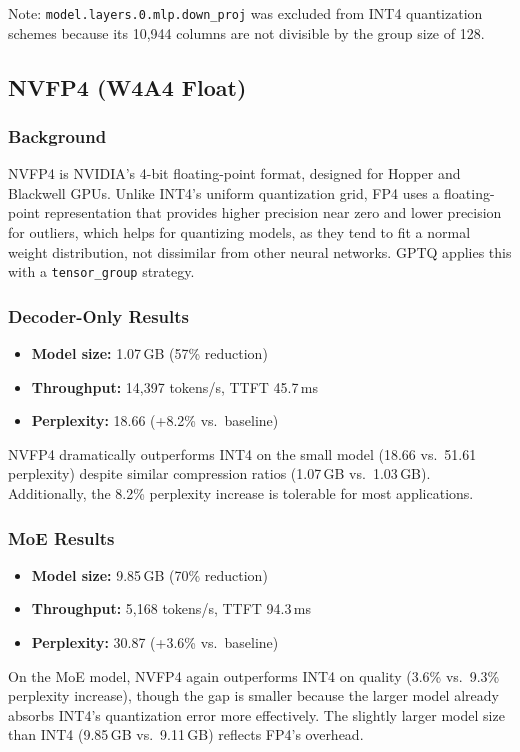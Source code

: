 \documentclass[10pt,twocolumn]{article}
\begin{document}
Note: \texttt{model.layers.0.mlp.down\_proj} was excluded from INT4 quantization schemes because its 10{,}944 columns are not divisible by the group size of 128.

\subsection{NVFP4 (W4A4 Float)}
\subsubsection{Background}
NVFP4 is NVIDIA's 4-bit floating-point format, designed for Hopper and Blackwell GPUs. Unlike INT4's uniform quantization grid, FP4 uses a floating-point representation that provides higher precision near zero and lower precision for outliers, which helps for quantizing models, as they tend to fit a normal weight distribution, not dissimilar from other neural networks. GPTQ applies this with a \texttt{tensor\_group} strategy.

\subsubsection{Decoder-Only Results}
\begin{itemize}
  \item \textbf{Model size:} 1.07\,GB (57\% reduction)
  \item \textbf{Throughput:} 14{,}397 tokens/s, TTFT 45.7\,ms
  \item \textbf{Perplexity:} 18.66 (+8.2\% vs.\ baseline)
\end{itemize}
NVFP4 dramatically outperforms INT4 on the small model (18.66 vs.\ 51.61 perplexity) despite similar compression ratios (1.07\,GB vs.\ 1.03\,GB). Additionally, the 8.2\% perplexity increase is tolerable for most applications.

\subsubsection{MoE Results}
\begin{itemize}
  \item \textbf{Model size:} 9.85\,GB (70\% reduction)
  \item \textbf{Throughput:} 5{,}168 tokens/s, TTFT 94.3\,ms
  \item \textbf{Perplexity:} 30.87 (+3.6\% vs.\ baseline)
\end{itemize}
On the MoE model, NVFP4 again outperforms INT4 on quality (3.6\% vs.\ 9.3\% perplexity increase), though the gap is smaller because the larger model already absorbs INT4's quantization error more effectively. The slightly larger model size than INT4 (9.85\,GB vs.\ 9.11\,GB) reflects FP4's overhead.
\end{document}
